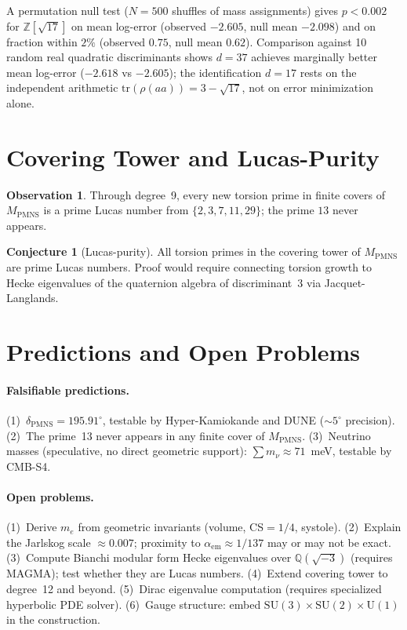 \documentclass[11pt,a4paper]{article}
\theoremstyle{definition}
\newtheorem{observation}[theorem]{Observation}
\newtheorem{conjecture}[theorem]{Conjecture}
\theoremstyle{remark}
\newcommand{\MPMNS}{M_{\mathrm{PMNS}}}
\newcommand{\Zsev}{\mathbb{Z}[\sqrt{17}]}
\begin{document}
A permutation null test ($N=500$ shuffles of mass assignments) gives
$p<0.002$ for $\Zsev$ on mean log-error (observed $-2.605$,
null mean $-2.098$) and on fraction within $2\%$ (observed $0.75$,
null mean $0.62$).
Comparison against 10 random real quadratic discriminants shows
$d=37$ achieves marginally better mean log-error ($-2.618$ vs
$-2.605$); the identification $d=17$ rests on the independent
arithmetic $\mathrm{tr}(\rho(aa))=3-\sqrt{17}$, not on error
minimization alone.

\section{Covering Tower and Lucas-Purity}
\label{sec:covering}

\begin{observation}
Through degree~9, every new torsion prime in finite covers of
$\MPMNS$ is a prime Lucas number from $\{2,3,7,11,29\}$;
the prime $13$ never appears.
\end{observation}

\begin{conjecture}[Lucas-purity]
All torsion primes in the covering tower of $\MPMNS$ are prime Lucas numbers.
Proof would require connecting torsion growth to Hecke eigenvalues
of the quaternion algebra of discriminant~3 via Jacquet-Langlands.
\end{conjecture}

\section{Predictions and Open Problems}
\label{sec:predictions}

\paragraph{Falsifiable predictions.}
(1)~$\delta_{\mathrm{PMNS}} = 195.91^\circ$, testable by
Hyper-Kamiokande and DUNE ($\sim5^\circ$ precision).
(2)~The prime~13 never appears in any finite cover of $\MPMNS$.
(3)~Neutrino masses (speculative, no direct geometric support):
$\sum m_\nu\approx71$~meV, testable by CMB-S4.

\paragraph{Open problems.}
(1)~Derive $m_e$ from geometric invariants (volume, CS$=1/4$,
systole).
(2)~Explain the Jarlskog scale $\approx0.007$; proximity to
$\alpha_{\mathrm{em}}\approx1/137$ may or may not be exact.
(3)~Compute Bianchi modular form Hecke eigenvalues over
$\mathbb{Q}(\sqrt{-3})$ (requires MAGMA); test whether they are
Lucas numbers.
(4)~Extend covering tower to degree~12 and beyond.
(5)~Dirac eigenvalue computation (requires specialized hyperbolic
PDE solver).
(6)~Gauge structure: embed $\mathrm{SU}(3)\times\mathrm{SU}(2)
\times\mathrm{U}(1)$ in the construction.
\end{document}
